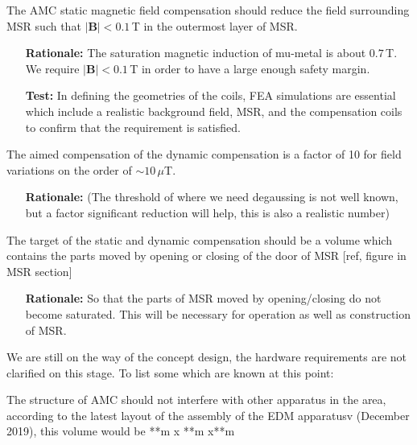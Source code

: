 \begin{RSenumerate}[resume]
\item    The AMC static magnetic field compensation should reduce the field surrounding MSR such that $|\mathbf{B}|<0.1\,$T in the outermost layer of MSR.
\label{RS:amc_static}

\begin{itemize}
    \item[\textbf{Rationale:}]  The saturation magnetic induction of mu-metal is about $ 0.7\,$T. We require $|\mathbf{B}|<0.1\,$T  in order to have a large enough safety margin.
    \item[\textbf{Test:}] In defining the geometries of the coils, FEA simulations are essential which include a realistic background field, MSR, and the compensation coils to confirm that the requirement is satisfied. 
    
\end{itemize}
 \item The aimed compensation of the dynamic compensation is a factor of 10 for field variations on the order of $\sim 10\,\mu$T.
 \begin{itemize}
    \item[\textbf{Rationale:}]  (The threshold of where we need degaussing is not well known, but a factor significant reduction will help, this is also a realistic number)
\end{itemize}

  \item The target of the static and dynamic compensation should be a  volume which contains the parts moved by opening or closing of the door of MSR [ref, figure in MSR section] \label{RS:amc_volume}
 \begin{itemize}
    \item[\textbf{Rationale:}] So that the parts of MSR moved by opening/closing do not become saturated. This will be necessary for operation as well as construction of MSR. 
    
\end{itemize}
 

\end{RSenumerate}

We are still on the way of the concept design, the hardware requirements are not clarified  on this stage. To list some which are known at this point: 

\begin{RSenumerate}[resume]
\item The structure of AMC should not interfere with other apparatus in the area, according  to the latest layout of the assembly of the EDM apparatusv (December 2019), this volume would be **m x **m x**m 
\item 

\end{RSenumerate}

